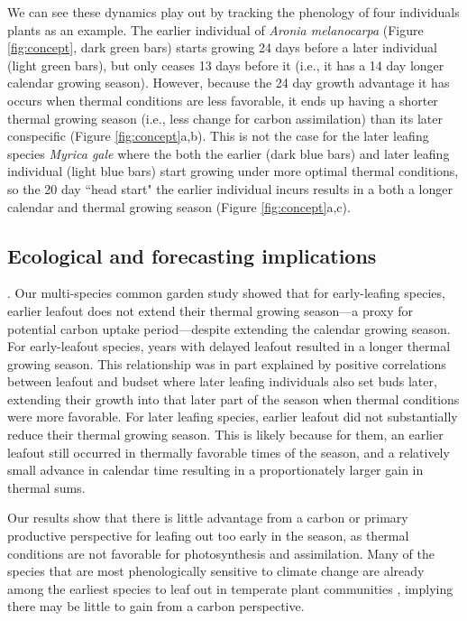 \documentclass{article}[12pt]
\begin{document}
We can see these dynamics play out by tracking the phenology of four individuals plants as an example. The earlier individual of \emph{Aronia melanocarpa} (Figure \ref{fig:concept}, dark green bars) starts growing 24 days before a later individual (light green bars), but only ceases 13 days before it (i.e., it has a 14 day longer calendar growing season). However, because the 24 day growth advantage it has occurs when thermal conditions are less favorable, it ends up having a shorter thermal growing season (i.e., less change for carbon assimilation) than its later conspecific (Figure \ref{fig:concept}a,b). This is not the case for the later leafing species \emph{Myrica gale} where the both the earlier (dark blue bars) and later leafing individual (light blue bars) start growing under more optimal thermal conditions, so the 20 day ``head start" the earlier individual incurs results in a both a longer calendar and thermal growing season (Figure \ref{fig:concept}a,c). 

\subsection{Ecological and forecasting implications}. 
Our multi-species common garden study showed that for early-leafing species, earlier leafout does not extend their thermal growing season---a proxy for potential carbon uptake period---despite extending the calendar growing season. For early-leafout species, years with delayed leafout resulted in a longer thermal growing season. This relationship was in part explained by positive correlations between leafout and budset where later leafing individuals also set buds later, extending their growth into that later part of the season when thermal conditions were more favorable. For later leafing species, earlier leafout did not substantially reduce their thermal growing season. This is likely because for them, an earlier leafout still occurred in thermally favorable times of the season, and a relatively small advance in calendar time resulting in a proportionately larger gain in thermal sums.

Our results show that there is little advantage from a carbon or primary productive perspective for leafing out too early in the season, as thermal conditions are not favorable for photosynthesis and assimilation. Many of the species that are most phenologically sensitive to climate change are already among the earliest species to leaf out in temperate plant communities \citep{Shen2014,Geng2020}, implying there may be little to gain from a carbon perspective.
\end{document}
